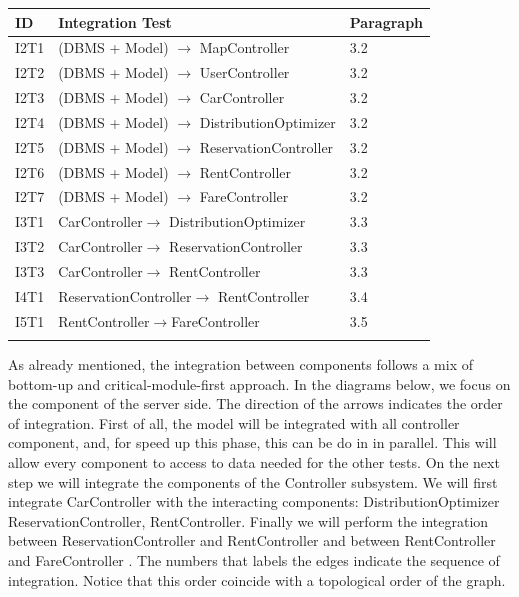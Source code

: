 \begin{center}
\begin{tabular*}
{\textwidth}
{l p{8.5cm} l}
\hline
\textbf{ID} & \textbf{Integration Test} & \textbf{Paragraph} \\
\hline
I2T1 & (DBMS + Model) $\rightarrow$ MapController & 3.2\\
I2T2 & (DBMS + Model) $\rightarrow$ UserController & 3.2\\
I2T3 & (DBMS + Model) $\rightarrow$ CarController & 3.2\\
I2T4 & (DBMS + Model) $\rightarrow$ DistributionOptimizer & 3.2\\
I2T5 & (DBMS + Model) $\rightarrow$ ReservationController & 3.2\\
I2T6 & (DBMS + Model) $\rightarrow$ RentController & 3.2\\
I2T7 & (DBMS + Model) $\rightarrow$ FareController & 3.2\\
I3T1 &CarController$\rightarrow$ DistributionOptimizer & 3.3\\
I3T2 &CarController$\rightarrow$ ReservationController & 3.3\\
I3T3 &CarController$\rightarrow$ RentController & 3.3\\
I4T1 &ReservationController$\rightarrow$ RentController & 3.4\\
I5T1 &RentController$\rightarrow$FareController & 3.5\\
\hline
\newline
\newline
\end{tabular*}
\end{center}




As already mentioned, the integration between components follows a mix of bottom-up and critical-module-first approach. In the diagrams below, we focus on the component of the server side. The direction of the arrows indicates the order of integration. 
First of all, the model will be integrated with all controller component, and, for speed up this phase, this can be do in in parallel. This will allow every component to access to data needed for the other tests. On the next step we will integrate the components of the Controller subsystem. We will first integrate CarController with the interacting components: DistributionOptimizer
ReservationController, RentController.
Finally we will perform the  integration between ReservationController and RentController and between RentController and FareController .
The numbers that labels the edges indicate the sequence of integration. Notice that this order coincide with a topological order of the graph.

